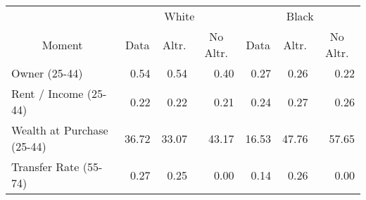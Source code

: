 \begin{tabular}{l rrr rrr}
\toprule & \multicolumn{3}{c}{White} & \multicolumn{3}{c}{Black} \\ \cmidrule(lr){2-4}\cmidrule(lr){5-7}
\multicolumn{1}{c}{Moment} & \multicolumn{1}{c}{Data} & \multicolumn{1}{c}{Altr.} & \multicolumn{1}{c}{No Altr.} & \multicolumn{1}{c}{Data} & \multicolumn{1}{c}{Altr.} & \multicolumn{1}{c}{No Altr.}\\
\midrule
\;Owner (25-44) & 0.54 & 0.54 & 0.40 & 0.27 & 0.26 & 0.22\\
\;Rent / Income (25-44) & 0.22 & 0.22 & 0.21 & 0.24 & 0.27 & 0.26\\
\;Wealth at Purchase (25-44) & 36.72 & 33.07 & 43.17 & 16.53 & 47.76 & 57.65\\
\;Transfer Rate (55-74) & 0.27 & 0.25 & 0.00 & 0.14 & 0.26 & 0.00\\
\bottomrule
\end{tabular}
